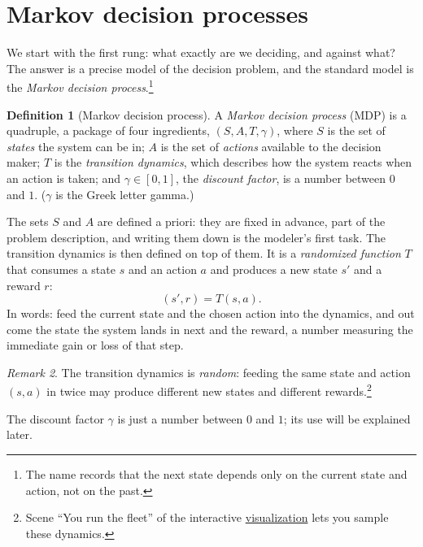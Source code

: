\documentclass[11pt,a4paper]{article}
\theoremstyle{definition}
\newtheorem{definition}{Definition}[section]
\theoremstyle{remark}
\newtheorem{remark}[definition]{Remark}
\numberwithin{equation}{section}
\newcommand{\vizhref}[1]{\href{https://eth-ainit-fs26.github.io/rl-arcade/repair-or-replace/}{#1}}
\begin{document}
\section{Markov decision processes}

We start with the first rung: what exactly are we deciding, and against what? The answer is a
precise model of the decision problem, and the standard model is the \emph{Markov decision
process}.\footnote{The name records that the next state depends only on the current state and
action, not on the past.}

\begin{definition}[Markov decision process]
A \emph{Markov decision process} (MDP) is a quadruple, a package of four ingredients,
$(S, A, T, \gamma)$, where $S$ is the set of \emph{states} the system can be in; $A$ is the
set of \emph{actions} available to the decision maker; $T$ is the \emph{transition dynamics},
which describes how the system reacts when an action is taken; and $\gamma \in [0,1]$, the
\emph{discount factor}, is a number between $0$ and $1$. ($\gamma$ is the Greek letter
gamma.)
\end{definition}

The sets $S$ and $A$ are defined a priori: they are fixed in advance, part of the problem
description, and writing them down is the modeler's first task. The transition dynamics is
then defined on top of them. It is a \emph{randomized function} $T$ that consumes a state $s$
and an action $a$ and produces a new state $s'$ and a reward $r$:
\[
(s', r) = T(s, a).
\]
In words: feed the current state and the chosen action into the dynamics, and out come the
state the system lands in next and the reward, a number measuring the immediate gain or loss
of that step.

\begin{remark}\label{rem:randomdyn}
The transition dynamics is \emph{random}: feeding the same state and action $(s, a)$ in twice
may produce different new states and different rewards.\footnote{Scene ``You run the fleet''
of the interactive \vizhref{visualization} lets you sample these dynamics.}
\end{remark}

The discount factor $\gamma$ is just a number between $0$ and $1$; its use will be explained
later.
\end{document}
